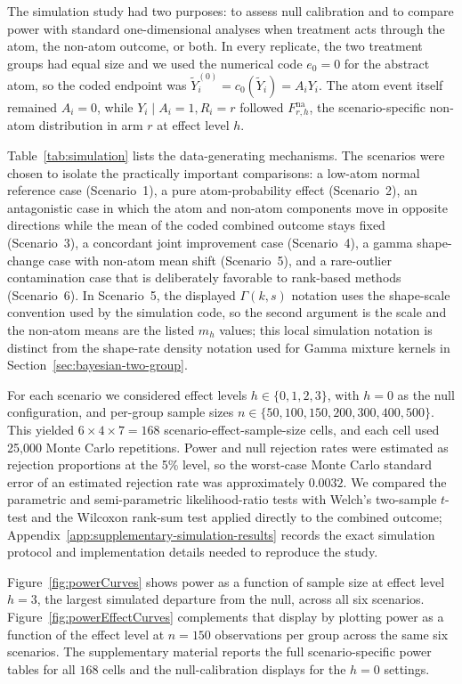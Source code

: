 \documentclass[11pt]{article}
\begin{document}
The simulation study had two purposes: to assess null calibration and to compare power with standard one-dimensional analyses when treatment acts through the atom, the non-atom outcome, or both. In every replicate, the two treatment groups had equal size and we used the numerical code $e_0=0$ for the abstract atom, so the coded endpoint was $\widetilde{Y}_i^{(0)}=c_0(\widetilde{Y}_i)=A_iY_i$. The atom event itself remained $A_i=0$, while $Y_i\mid A_i=1,R_i=r$ followed $F_{r,h}^{\mathrm{na}}$, the scenario-specific non-atom distribution in arm $r$ at effect level $h$.

Table~\ref{tab:simulation} lists the data-generating mechanisms. The scenarios were chosen to isolate the practically important comparisons: a low-atom normal reference case (Scenario~1), a pure atom-probability effect (Scenario~2), an antagonistic case in which the atom and non-atom components move in opposite directions while the mean of the coded combined outcome stays fixed (Scenario~3), a concordant joint improvement case (Scenario~4), a gamma shape-change case with non-atom mean shift (Scenario~5), and a rare-outlier contamination case that is deliberately favorable to rank-based methods (Scenario~6). In Scenario~5, the displayed $\Gamma(k,s)$ notation uses the shape-scale convention used by the simulation code, so the second argument is the scale and the non-atom means are the listed $m_h$ values; this local simulation notation is distinct from the shape-rate density notation used for Gamma mixture kernels in Section~\ref{sec:bayesian-two-group}.



For each scenario we considered effect levels $h \in \{0, 1, 2, 3\}$, with $h = 0$ as the null configuration, and per-group sample sizes $n \in \{50,100,150,200,300,400,500\}$. This yielded $6 \times 4 \times 7 = 168$ scenario-effect-sample-size cells, and each cell used 25,000 Monte Carlo repetitions. Power and null rejection rates were estimated as rejection proportions at the 5\% level, so the worst-case Monte Carlo standard error of an estimated rejection rate was approximately $0.0032$. We compared the parametric and semi-parametric likelihood-ratio tests with Welch's two-sample $t$-test and the Wilcoxon rank-sum test applied directly to the combined outcome; Appendix~\ref{app:supplementary-simulation-results} records the exact simulation protocol and implementation details needed to reproduce the study.

Figure~\ref{fig:powerCurves} shows power as a function of sample size at effect level $h=3$, the largest simulated departure from the null, across all six scenarios. Figure~\ref{fig:powerEffectCurves} complements that display by plotting power as a function of the effect level at $n = 150$ observations per group across the same six scenarios. The supplementary material reports the full scenario-specific power tables for all $168$ cells and the null-calibration displays for the $h = 0$ settings.
\end{document}
